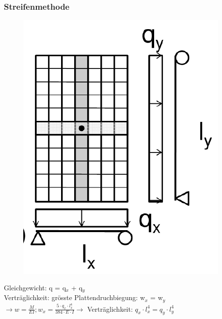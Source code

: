 	\begin{minipage}{0.35\linewidth}
		
		\subsubsection{Streifenmethode}
		
		\begin{figure}
			\includegraphics[width=\linewidth]{images/DW4Achse.PNG}
		\end{figure}
	
		Gleichgewicht: q = q$_x$ + q$_y$ \\
		Verträglichkeit: grösste Plattendruchbiegung: w$_x$ = w$_y$ \\
		$ \rightarrow w = \frac{M}{EI}; w_x = \frac{5 \cdot q_x \cdot l_x^4}{384 \cdot E \cdot I}  \rightarrow $ Verträglichkeit: $ q_x \cdot l_x^4 = q_y \cdot l_y^4 $ \\
		
		

\end{minipage}
